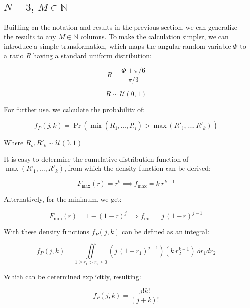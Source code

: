 \documentclass{article}
\theoremstyle{definition}
\begin{document}
\begin{appendices}
\section{$N=3$, $M\in\mathbb{N}$}

Building on the notation and results in the previous section, we can generalize the results to any $M \in \mathbb{N}$ columns.
To make the calculation simpler, we can introduce a simple transformation, which maps the angular random variable $\Phi$ to a ratio $R$ having a standard uniform distribution:

\begin{equation}
    R = \frac{\Phi+\pi/6}{\pi/3}
\end{equation}

\begin{equation}
    R \sim \mathcal{U}(0,1)
\end{equation}

For further use, we calculate the probability of:

\begin{equation}
    f_P(j,k) 
    =
    \Pr(\min(R_1,\dots,R_j)>\max(R'_1,\dots,R'_k))
\end{equation}

Where $R_a,R'_b \sim \mathcal{U}(0,1)$.

It is easy to determine the cumulative distribution function of $\max(R'_1,\dots,R'_k)$, from which the density function can be derived:

\begin{equation}
    F_{\max}(r) = r^k
    \implies
    f_{\max} = k \ r^{k-1}
\end{equation}

Alternatively, for the minimum, we get:

\begin{equation}
    F_{\min}(r) = 1 - (1-r)^j
    \implies
    f_{\min} = j \ (1-r)^{j-1}
\end{equation}

With these density functions $f_P(j,k)$ can be defined as an integral:

\begin{equation}
    f_P(j,k) = 
    \underset{1 \ge r_1 > r_2 \ge 0}{\iint}
    (j \ (1-r_1)^{j-1})(k \ r_2^{k-1})
    \ dr_1 dr_2
\end{equation}

Which can be determined explicitly, resulting:

\begin{equation}
    f_P(j,k) = 
    \frac{j! k!}{(j+k)!}
\end{equation}


\end{appendices}
\end{document}
